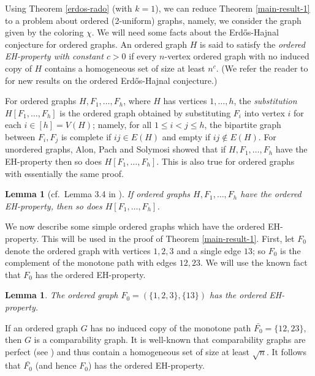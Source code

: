 \documentclass[11pt]{article}
\let\oldendproof\endproof
\renewenvironment{proof}[1][\proofname]{%
	\oldproof[\bf #1]%
}{\oldendproof}
\theoremstyle{plain}
\newtheorem{lemma}[theorem]{Lemma}
\begin{document}
Using Theorem \ref{erdos-rado} (with $k=1$), we can reduce Theorem \ref{main-result-1} to a problem about ordered (2-uniform) graphs, namely, we consider the graph given by the coloring $\chi$. We will need some facts about the Erd\H{o}s-Hajnal conjecture for ordered graphs. An ordered graph $H$ is said to satisfy the {\em ordered EH-property with constant $c > 0$} if every $n$-vertex ordered graph with no induced copy of $H$ contains a homogeneous set of size at least $n^c$. (We refer the reader to \cite{nguyen2023} for new results on the ordered Erd\H{o}s-Hajnal conjecture.)

For ordered graphs $H,F_1,\dots,F_h$, where $H$ has vertices $1,\dots,h$, the {\em substitution} $H[F_1,\dots,F_h]$ is the ordered graph obtained by substituting $F_i$ into vertex $i$ for each 
$i \in [h] = V(H)$; namely, for all $1 \leq i < j \leq h$, the bipartite graph between $F_i,F_j$ is complete if $ij \in E(H)$ and empty if $ij \notin E(H)$. For unordered graphs, Alon, Pach and Solymosi \cite{alonEHproperty} showed that if $H,F_1,\dots,F_h$ have the EH-property then so does $H[F_1,\dots,F_h]$. This is also true for ordered graphs with essentially the same proof.
\begin{lemma}[cf.~Lemma 3.4 in \cite{nguyen2023}]\label{lem:substitution}
    If ordered graphs $H,F_1,\dots,F_h$ have the ordered EH-property, then so does $H[F_1,\dots,F_h]$.
\end{lemma}

We now describe some simple ordered graphs which have the ordered EH-property. This will be used in the proof of Theorem \ref{main-result-1}.
First, let $F_0$ denote the ordered graph with vertices $1,2,3$ and a single edge $13$; so $F_0$ is the complement of the monotone path with edges $12,23$. We will use the known fact that $F_0$ has the ordered EH-property. 

\begin{lemma}\label{lem:comparability}
The ordered graph $F_0 = (\{1,2,3\}, \{13\})$ has the ordered EH-property.
\end{lemma}
\begin{proof}[Proof sketch]
    If an ordered graph $G$ has no induced copy of the monotone path $\bar{F_0} = \{12,23\}$, then $G$ is a comparability graph. It is well-known that comparability graphs are perfect (see \cite[Chapter 3]{Golumbic}) and thus contain a homogeneous set of size at least $\sqrt{n}$. It follows that $\bar{F_0}$ (and hence $F_0$) has the ordered EH-property.
\end{proof}
\end{document}
